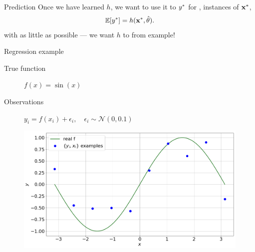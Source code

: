 \documentclass[lualatex, aspectratio=169]{beamer}
\begin{document}
\begin{frame}{Prediction}
  Once we have learned $h$, we want to use it to  ${y}^{*}$ for ,  instances of ${\mathbf{x}}^{*}$,
  \begin{align*}
    \mathbb{E}\!\left[{{y}^{*}}\right] = h({\mathbf{x}}^{*}, \hat{\theta}).
  \end{align*}
  with as little  as possible --- we want $h$ to  from example!
\end{frame}


\begin{frame}{Regression example}

  \begin{description}
    \item[True function] $f(x) = \sin(x)$
    \item[Observations] $y_i = f(x_i) + \epsilon_i, \quad \epsilon_i \sim \mathcal{N}(0, 0.1)$
  \end{description}

  \begin{figure}
    \includegraphics[width=0.5\pagewidth]{assets/regress.png}
  \end{figure}

\end{frame}




\end{document}
